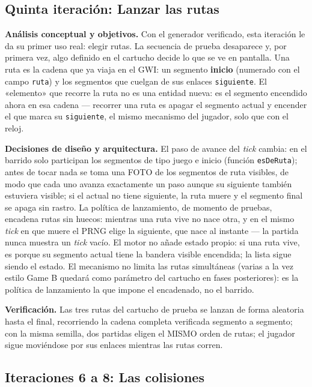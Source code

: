 \subsection{Quinta iteración: Lanzar las rutas}
\label{sec:F3Rutas}

\textbf{Análisis conceptual y objetivos.} Con el generador verificado,
esta iteración le da su primer uso real: elegir rutas. La secuencia de
prueba desaparece y, por primera vez, algo definido en el cartucho
decide lo que se ve en pantalla. Una ruta es la cadena que ya viaja en
el GWI: un segmento \textbf{inicio} (numerado con el campo
\texttt{ruta}) y los segmentos que cuelgan de sus enlaces
\texttt{siguiente}. El «elemento» que recorre la ruta no es una entidad
nueva: es el segmento encendido ahora en esa cadena — recorrer una ruta
es apagar el segmento actual y encender el que marca su
\texttt{siguiente}, el mismo mecanismo del jugador, solo que con el
reloj.

\textbf{Decisiones de diseño y arquitectura.} El paso de avance del
\textit{tick} cambia: en el barrido solo participan los segmentos de
tipo juego e inicio (función \texttt{esDeRuta}); antes de tocar nada se
toma una FOTO de los segmentos de ruta visibles, de modo que cada uno
avanza exactamente un paso aunque su siguiente también estuviera
visible; si el actual no tiene siguiente, la ruta muere y el segmento
final se apaga sin rastro. La política de lanzamiento, de momento de
pruebas, encadena rutas sin huecos: mientras una ruta vive no nace otra,
y en el mismo \textit{tick} en que muere el PRNG elige la siguiente, que
nace al instante — la partida nunca muestra un \textit{tick} vacío. El
motor no añade estado propio: si una ruta vive, es porque su segmento
actual tiene la bandera visible encendida; la lista sigue siendo el
estado. El mecanismo no limita las rutas simultáneas (varias a la vez
estilo Game B quedará como parámetro del cartucho en fases posteriores):
es la política de lanzamiento la que impone el encadenado, no el
barrido.

\textbf{Verificación.} Las tres rutas del cartucho de prueba se lanzan
de forma aleatoria hasta el final, recorriendo la cadena completa
verificada segmento a segmento; con la misma semilla, dos partidas
eligen el MISMO orden de rutas; el jugador sigue moviéndose por sus
enlaces mientras las rutas corren.

\subsection{Iteraciones 6 a 8: Las colisiones}
\label{sec:F3Colisiones}


